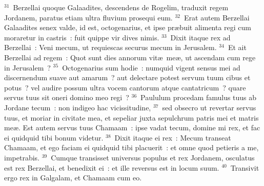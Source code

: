 ${}^{31}$~Berzellai quoque Galaadites, descendens de Rogelim, traduxit regem Jordanem, paratus etiam ultra fluvium prosequi eum.
${}^{32}$~Erat autem Berzellai Galaadites senex valde, id est, octogenarius, et ipse pr\ae buit alimenta regi cum moraretur in castris~: fuit quippe vir dives nimis.
${}^{33}$~Dixit itaque rex ad Berzellai~: Veni mecum, ut requiescas securus mecum in Jerusalem.
${}^{34}$~Et ait Berzellai ad regem~: Quot sunt dies annorum vit\ae\ me\ae , ut ascendam cum rege in Jerusalem~?
${}^{35}$~Octogenarius sum hodie~: numquid vigent sensus mei ad discernendum suave aut amarum~? aut delectare potest servum tuum cibus et potus~? vel audire possum ultra vocem cantorum atque cantatricum~? quare servus tuus sit oneri domino meo regi~?
${}^{36}$~Paululum procedam famulus tuus ab Jordane tecum~: non indigeo hac vicissitudine,
${}^{37}$~sed obsecro ut revertar servus tuus, et moriar in civitate mea, et sepeliar juxta sepulchrum patris mei et matris me\ae . Est autem servus tuus Chamaam~: ipse vadat tecum, domine mi rex, et fac ei quidquid tibi bonum videtur.
${}^{38}$~Dixit itaque ei rex~: Mecum transeat Chamaam, et ego faciam ei quidquid tibi placuerit~: et omne quod petieris a me, impetrabis.
${}^{39}$~Cumque transisset universus populus et rex Jordanem, osculatus est rex Berzellai, et benedixit ei~: et ille reversus est in locum suum.
${}^{40}$~Transivit ergo rex in Galgalam, et Chamaam cum eo.

